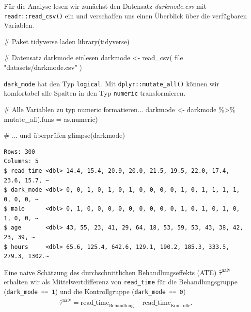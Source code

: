 \documentclass[
  a4paper,
  DIV=11,
  oneside]{scrreprt}
\newenvironment{Shaded}{\begin{snugshade}}{\end{snugshade}}
\newcommand{\AttributeTok}[1]{\textcolor[rgb]{0.40,0.45,0.13}{#1}}
\newcommand{\CommentTok}[1]{\textcolor[rgb]{0.37,0.37,0.37}{#1}}
\newcommand{\FunctionTok}[1]{\textcolor[rgb]{0.28,0.35,0.67}{#1}}
\newcommand{\NormalTok}[1]{\textcolor[rgb]{0.00,0.23,0.31}{#1}}
\newcommand{\OtherTok}[1]{\textcolor[rgb]{0.00,0.23,0.31}{#1}}
\newcommand{\SpecialCharTok}[1]{\textcolor[rgb]{0.37,0.37,0.37}{#1}}
\newcommand{\StringTok}[1]{\textcolor[rgb]{0.13,0.47,0.30}{#1}}
\begin{document}
\endgroup

Für die Analyse lesen wir zunächst den Datensatz \emph{darkmode.csv} mit
\texttt{readr::read\_csv()} ein und verschaffen uns einen Überblick über
die verfügbaren Variablen.

\begin{Shaded}
\begin{Highlighting}[]
\CommentTok{\# Paket \textasciigrave{}tidyverse\textasciigrave{} laden}
\FunctionTok{library}\NormalTok{(tidyverse)}

\CommentTok{\# Datensatz \textquotesingle{}darkmode\textquotesingle{} einlesen}
\NormalTok{darkmode }\OtherTok{\textless{}{-}} \FunctionTok{read\_csv}\NormalTok{(}
  \AttributeTok{file =} \StringTok{"datasets/darkmode.csv"}
\NormalTok{)}
\end{Highlighting}
\end{Shaded}

\texttt{dark\_mode} hat den Typ \texttt{logical}. Mit
\texttt{dplyr::mutate\_all()} können wir komfortabel alle Spalten in den
Typ \texttt{numeric} transformieren.

\begin{Shaded}
\begin{Highlighting}[]
\CommentTok{\# Alle Variablen zu typ \textquotesingle{}numeric\textquotesingle{} formatieren...}
\NormalTok{darkmode }\OtherTok{\textless{}{-}}\NormalTok{ darkmode }\SpecialCharTok{\%\textgreater{}\%} 
  \FunctionTok{mutate\_all}\NormalTok{(}\AttributeTok{.funs =}\NormalTok{ as.numeric)}

\CommentTok{\# ... und überprüfen}
\FunctionTok{glimpse}\NormalTok{(darkmode)}
\end{Highlighting}
\end{Shaded}

\begin{verbatim}
Rows: 300
Columns: 5
$ read_time <dbl> 14.4, 15.4, 20.9, 20.0, 21.5, 19.5, 22.0, 17.4, 23.6, 15.7, ~
$ dark_mode <dbl> 0, 0, 1, 0, 1, 0, 1, 0, 0, 0, 0, 1, 0, 1, 1, 1, 1, 0, 0, 0, ~
$ male      <dbl> 0, 1, 0, 0, 0, 0, 0, 0, 0, 0, 0, 1, 0, 1, 0, 1, 0, 1, 0, 0, ~
$ age       <dbl> 43, 55, 23, 41, 29, 64, 18, 53, 59, 53, 43, 38, 42, 23, 39, ~
$ hours     <dbl> 65.6, 125.4, 642.6, 129.1, 190.2, 185.3, 333.5, 279.3, 1302.~
\end{verbatim}

Eine naive Schätzung des durchschnittlichen Behandlungseffekts (ATE)
\(\widehat{\tau}^{\text{naiv}}\) erhalten wir als Mittelwertdifferenz
von \texttt{read\_time} für die Behandlungsgruppe
(\texttt{dark\_mode\ ==\ 1}) und die Kontrollgruppe
(\texttt{dark\_mode\ ==\ 0}) \begin{align}
  \widehat{\tau}^{\text{naiv}} = \overline{\text{read\_time}}_{\text{Behandlung}} - \overline{\text{read\_time}}_{\text{Kontrolle}}.\label{eq:naivATEdarkmode}
\end{align}
\end{document}
